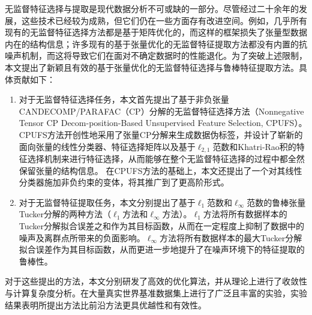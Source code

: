 \begin{cabstract}
    无监督特征选择与提取是现代数据分析不可或缺的一部分。尽管经过二十余年的发展，这些技术已经较为成熟，但它们仍在一些方面存有改进空间。例如，几乎所有现有的无监督特征选择方法都是基于矩阵优化的，而这样的框架损失了张量型数据内在的结构信息；许多现有的基于张量优化的无监督特征提取方法都没有内置的抗噪声机制，而这将导致它们在面对不确定数据时的性能退化。为了突破上述限制，本文提出了新颖且有效的基于张量优化的无监督特征选择与鲁棒特征提取方法。具体贡献如下：
    \begin{enumerate}[wide]
        \item 对于无监督特征选择任务，本文首先提出了基于非负张量CANDECOMP/\linebreak PARAFAC（CP）分解的无监督特征选择方法（Nonnegative Tensor CP Decom-position-Based Unsupervised Feature Selection, CPUFS）。CPUFS方法开创性地采用了张量CP分解来生成数据伪标签，并设计了崭新的面向张量的线性分类器、特征选择矩阵以及基于$\ell_{2,1}$范数和Khatri-Rao积的特征选择机制来进行特征选择，从而能够在整个无监督特征选择的过程中都全然保留张量的结构信息。
        在CPUFS方法的基础上，本文还提出了一个对其线性分类器施加非负约束的变体，将其推广到了更高阶形式。
        \item 对于无监督特征提取任务，本文分别提出了基于$\ell_{1}$范数和$\ell_{\infty}$范数的鲁棒张量Tucker分解的两种方法（$\ell_{1}$方法和$\ell_{\infty}$方法）。$\ell_{1}$方法将所有数据样本的Tucker分解拟合误差之和作为其目标函数，从而在一定程度上抑制了数据中的噪声及离群点所带来的负面影响。$\ell_{\infty}$方法将所有数据样本的最大Tucker分解拟合误差作为其目标函数，从而更进一步地提升了在噪声环境下的特征提取的鲁棒性。
    \end{enumerate}
    
    对于这些提出的方法，本文分别研发了高效的优化算法，并从理论上进行了收敛性与计算复杂度分析。在大量真实世界基准数据集上进行了广泛且丰富的实验，实验结果表明所提出方法比前沿方法更具优越性和有效性。
    
\end{cabstract}

